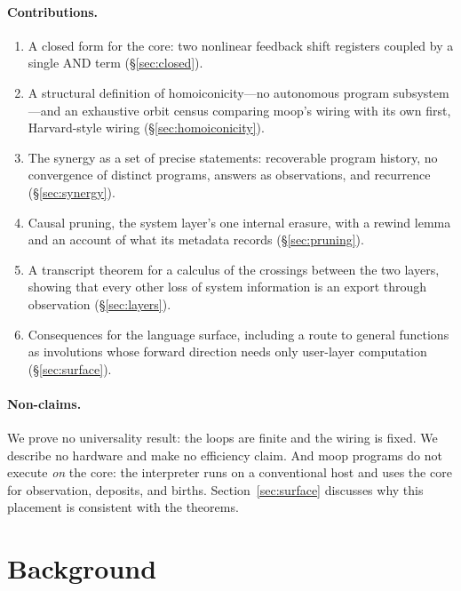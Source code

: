 \documentclass[11pt]{article}
\theoremstyle{definition}
\theoremstyle{remark}
\newcommand{\moop}{\textsf{moop}}
\begin{document}
\paragraph{Contributions.}
\begin{enumerate}[nosep]
\item A closed form for the core: two nonlinear feedback shift registers
  coupled by a single AND term (\S\ref{sec:closed}).
\item A structural definition of homoiconicity---no autonomous program
  subsystem---and an exhaustive orbit census comparing \moop{}'s wiring
  with its own first, Harvard-style wiring
  (\S\ref{sec:homoiconicity}).
\item The synergy as a set of precise statements: recoverable program
  history, no convergence of distinct programs, answers as observations,
  and recurrence (\S\ref{sec:synergy}).
\item Causal pruning, the system layer's one internal erasure, with a
  rewind lemma and an account of what its metadata records
  (\S\ref{sec:pruning}).
\item A transcript theorem for a calculus of the crossings between the
  two layers, showing that every other loss of system information is an
  export through observation (\S\ref{sec:layers}).
\item Consequences for the language surface, including a route to
  general functions as involutions whose forward direction needs only
  user-layer computation (\S\ref{sec:surface}).
\end{enumerate}

\paragraph{Non-claims.} We prove no universality result: the loops are
finite and the wiring is fixed. We describe no hardware and make no
efficiency claim. And \moop{} programs do not execute \emph{on} the
core: the interpreter runs on a conventional host and uses the core for
observation, deposits, and births. Section~\ref{sec:surface} discusses why
this placement is consistent with the theorems.

\section{Background}
\label{sec:background}
\end{document}
